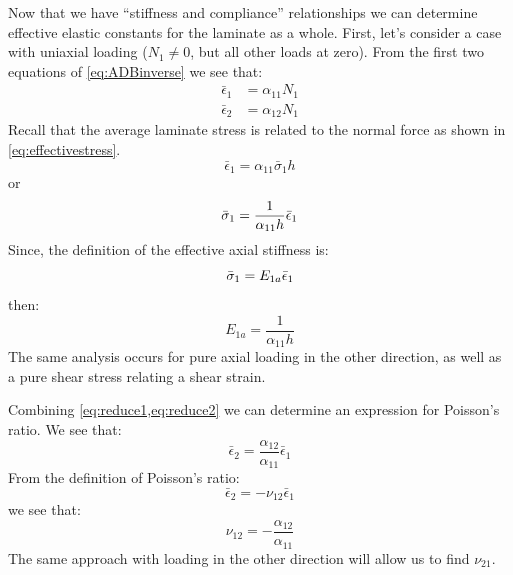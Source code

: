 \documentclass{article}
\begin{document}
Now that we have ``stiffness and compliance'' relationships we can determine effective elastic constants for the laminate as a whole. First, let's consider a case with uniaxial loading ($N_1 \ne 0$, but all other loads at zero).  From the first two equations of \cref{eq:ADBinverse} we see that:
\begin{align}
\bar\epsilon_1 &= \alpha_{11} N_1 \label{eq:reduce1}\\
\bar\epsilon_2 &= \alpha_{12} N_1 \label{eq:reduce2}
\end{align}
Recall that the average laminate stress is related to the normal force as shown in \cref{eq:effectivestress}.
\begin{equation}
\bar\epsilon_1 = \alpha_{11} \bar\sigma_1 h
\end{equation}
or
\begin{equation}
    \bar\sigma_1 = \frac{1}{\alpha_{11} h} \bar\epsilon_1 \\
\end{equation}
Since, the definition of the effective axial stiffness is:
\begin{equation}
    \bar\sigma_1 = E_{1a} \bar\epsilon_1 \\
\end{equation}
then:
\begin{equation}
E_{1a} = \frac{1}{\alpha_{11} h}
\end{equation}
The same analysis occurs for pure axial loading in the other direction, as well as a pure shear stress relating a shear strain.

Combining \cref{eq:reduce1,eq:reduce2} we can determine an expression for Poisson's ratio.  We see that:
\begin{equation}
    \bar\epsilon_2 = \frac{\alpha_{12}}{\alpha_{11}} \bar\epsilon_1
\end{equation}
From the definition of Poisson's ratio:
\begin{equation}
    \bar\epsilon_2 = -\nu_{12} \bar\epsilon_1
\end{equation}
we see that:
\begin{equation}
    \nu_{12} = -\frac{\alpha_{12}}{\alpha_{11}}
\end{equation}
The same approach with loading in the other direction will allow us to find $\nu_{21}$.
\end{document}
